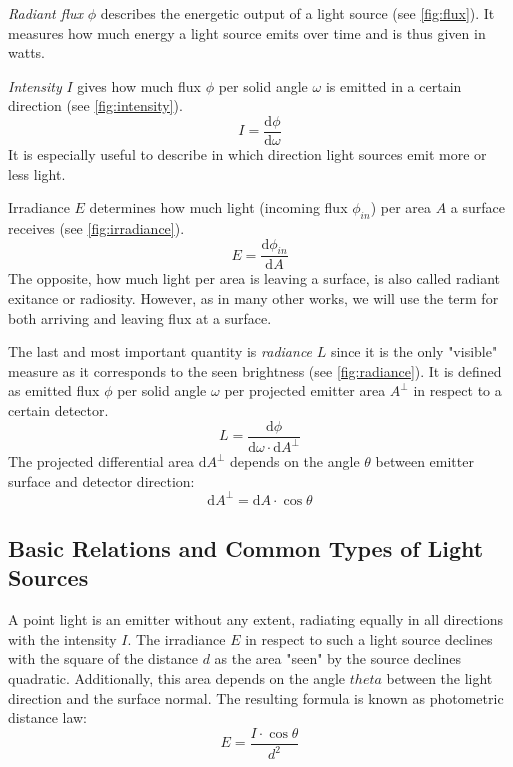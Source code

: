 \documentclass[thesis.tex]{subfiles}
\begin{document}
\emph{Radiant flux} $\phi$ describes the energetic output of a light source (see \autoref{fig:flux}).
It measures how much energy a light source emits over time and is thus given in watts.

\emph{Intensity} $I$ gives how much flux $\phi$ per solid angle $\omega$ is emitted in a certain direction (see \autoref{fig:intensity}).
\begin{equation}
I = \frac{\mathrm{d}\phi}{\mathrm{d}\omega}
\end{equation}
It is especially useful to describe in which direction light sources emit more or less light.

Irradiance $E$ determines how much light (incoming flux $\phi_{in}$) per area $A$ a surface receives (see \autoref{fig:irradiance}).
\begin{equation}
E = \frac{\mathrm{d}\phi_{in}}{\mathrm{d}A}
\end{equation}
The opposite, how much light per area is leaving a surface, is also called radiant exitance or radiosity.
However, as in many other works, we will use the term for both arriving and leaving flux at a surface.

The last and most important quantity is \emph{radiance} $L$ since it is the only "visible" measure as it corresponds to the seen brightness (see \autoref{fig:radiance}).
It is defined as emitted flux $\phi$ per solid angle $\omega$ per projected emitter area $A^\perp$ in respect to a certain detector.
\begin{equation}
L = \frac{\mathrm{d}\phi}{\mathrm{d}\omega \cdot \mathrm{d}A^\perp }
\end{equation}
The projected differential area $\mathrm{d}A^\perp$ depends on the angle $\theta$ between emitter surface and detector direction:
\begin{equation}
\mathrm{d}A^\perp = \mathrm{d}A \cdot \cos\theta
\end{equation}


\subsection{Basic Relations and Common Types of Light Sources} \label{sec:preq:theo:relation}
A point light is an emitter without any extent, radiating equally in all directions with the intensity $I$.
The irradiance  $E$ in respect to such a light source declines with the square of the distance $d$ as the area "seen" by the source declines quadratic.
Additionally, this area depends on the angle $theta$ between the light direction and the surface normal.
The resulting formula is known as photometric distance law:
\begin{equation}
E = \frac{I \cdot \cos\theta}{d^2}
\end{equation}
\end{document}
